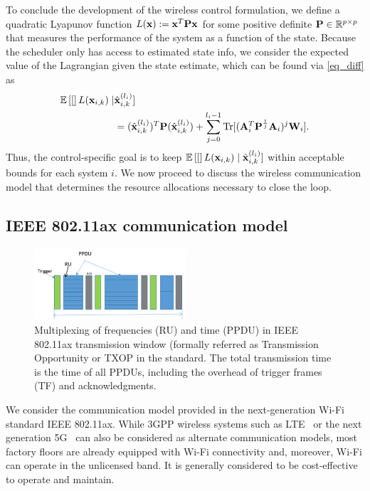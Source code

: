 To conclude the development of the wireless control formulation, we define a quadratic Lyapunov function $L({\mathbf x}) := {\mathbf x}^T {\mathbf P} {\mathbf x}$ for some positive definite ${\mathbf P} \in {\mathbb R}^{p \times p}$ that measures the performance of the system as a function of the state. Because the scheduler only has access to estimated state info, we consider the expected value of the Lagrangian given the state estimate, which can be found via \eqref{eq_diff} as
%
\begin{align}
\E [L(\bbx_{i,k}) \mid &\hbx^{(l_i)}_{i,k}]  \label{eq_perf} \\
&=  (\hbx^{(l_i)}_{i,k})^T \bbP (\hbx^{(l_i)}_{i,k}) + \sum_{j=0}^{l_i-1} \Tr[(\bbA_i^T\bbP^{\frac{1}{j}}\bbA_i)^{j} \bbW_i]. \nonumber
\end{align}
%
Thus, the control-specific goal is to keep ${\mathbb E}\left[[\right]L({\mathbf x}_{i,k}) \mid {\hat{\ensuremath{\mathbf x}} }^{(l_i)}_{i,k}]$ within acceptable bounds for each system $i$. We now proceed to discuss the wireless communication model that determines the resource allocations necessary to close the loop.

\subsection{IEEE 802.11ax communication model}\label{sec_comm_model}

\begin{figure}
%
\includegraphics[width=0.5\textwidth]{../images/schedule2.png}
\caption{Multiplexing of frequencies (RU) and time (PPDU) in IEEE 802.11ax transmission window (formally referred as Transmission Opportunity or TXOP in the standard. The total transmission time is the time of all PPDUs, including the overhead of trigger frames (TF) and acknowledgments.}
\label{fig_multiplex}
\end{figure}

We consider the communication model provided in the next-generation Wi-Fi standard IEEE 802.11ax. While 3GPP wireless systems such as LTE~\cite{sesia2011lte} or the next generation 5G~\cite{agiwal2016next} can also be considered as alternate communication models, most factory floors are already equipped with Wi-Fi connectivity and, moreover, Wi-Fi can operate in the unlicensed band. It is generally considered to be cost-effective to operate and maintain.

